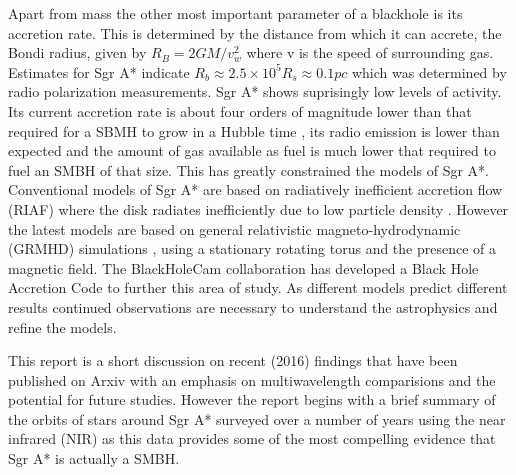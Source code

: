 \documentclass[a4paper,12pt]{article}
\begin{document}
Apart from mass the other most important parameter of a blackhole is its accretion rate. This is determined by the distance from which it can accrete, the Bondi radius, given by
$R_B=2GM/v_w^2$ where v is the speed of surrounding gas. Estimates for Sgr A* indicate $R_b\approx 2.5\times10^5 R_s \approx 0.1pc$ which was determined by radio polarization measurements.
Sgr A* shows suprisingly low levels of activity. Its current accretion rate is about four orders of magnitude lower than that required for a SBMH to grow in a Hubble time \citep{falke1}, 
its radio emission is lower than expected and the amount of gas available as fuel is much lower that required to fuel an SMBH of that size. This has greatly constrained the models of Sgr A*.
Conventional models of Sgr A* are based on radiatively inefficient accretion flow (RIAF) where the disk radiates inefficiently due to low particle density \citep{goddi}. However the latest models
are based on general relativistic magneto-hydrodynamic (GRMHD) simulations \citep{goddi}, using a stationary rotating torus and the presence of a magnetic field. The BlackHoleCam collaboration
\citep{goddi} has developed a Black Hole Accretion Code to further this area of study. As different models predict different results continued observations are necessary
to understand the astrophysics and refine the models.

This report is a short discussion on recent (2016) findings that have been published on Arxiv with an emphasis on multiwavelength comparisions and the potential for future studies. However the report
begins with a brief summary of the orbits of stars around Sgr A* surveyed over a number of years using the near infrared (NIR) as this data provides some of the most compelling evidence
that Sgr A* is actually a SMBH.
\end{document}
